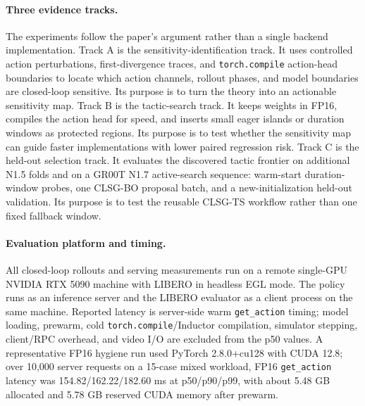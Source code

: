 \documentclass[10pt]{article}
\begin{document}
\paragraph{Three evidence tracks.}
The experiments follow the paper's argument rather than a single backend implementation. Track A is the sensitivity-identification track. It uses controlled action perturbations, first-divergence traces, and \texttt{torch.compile} action-head boundaries to locate which action channels, rollout phases, and model boundaries are closed-loop sensitive. Its purpose is to turn the theory into an actionable sensitivity map. Track B is the tactic-search track. It keeps weights in FP16, compiles the action head for speed, and inserts small eager islands or duration windows as protected regions. Its purpose is to test whether the sensitivity map can guide faster implementations with lower paired regression risk. Track C is the held-out selection track. It evaluates the discovered tactic frontier on additional N1.5 folds and on a GR00T N1.7 active-search sequence: warm-start duration-window probes, one CLSG-BO proposal batch, and a new-initialization held-out validation. Its purpose is to test the reusable CLSG-TS workflow rather than one fixed fallback window.

\paragraph{Evaluation platform and timing.}
All closed-loop rollouts and serving measurements run on a remote single-GPU NVIDIA RTX 5090 machine with LIBERO in headless EGL mode. The policy runs as an inference server and the LIBERO evaluator as a client process on the same machine. Reported latency is server-side warm \texttt{get\_action} timing; model loading, prewarm, cold \texttt{torch.compile}/Inductor compilation, simulator stepping, client/RPC overhead, and video I/O are excluded from the p50 values. A representative FP16 hygiene run used PyTorch 2.8.0+cu128 with CUDA 12.8; over 10,000 server requests on a 15-case mixed workload, FP16 \texttt{get\_action} latency was 154.82/162.22/182.60 ms at p50/p90/p99, with about 5.48 GB allocated and 5.78 GB reserved CUDA memory after prewarm.
\end{document}
